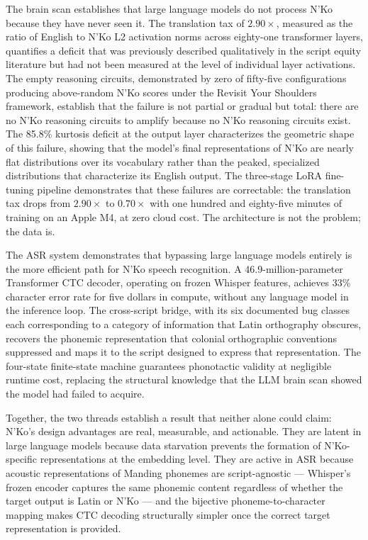 \documentclass[11pt]{article}
\newcommand{\nko}{N'Ko}
\begin{document}
The brain scan establishes that large language models do not process \nko{} because they have never seen it. The translation tax of $2.90\times$, measured as the ratio of English to \nko{} L2 activation norms across eighty-one transformer layers, quantifies a deficit that was previously described qualitatively in the script equity literature but had not been measured at the level of individual layer activations. The empty reasoning circuits, demonstrated by zero of fifty-five configurations producing above-random \nko{} scores under the Revisit Your Shoulders framework, establish that the failure is not partial or gradual but total: there are no \nko{} reasoning circuits to amplify because no \nko{} reasoning circuits exist. The 85.8\% kurtosis deficit at the output layer characterizes the geometric shape of this failure, showing that the model's final representations of \nko{} are nearly flat distributions over its vocabulary rather than the peaked, specialized distributions that characterize its English output. The three-stage LoRA fine-tuning pipeline demonstrates that these failures are correctable: the translation tax drops from $2.90\times$ to $0.70\times$ with one hundred and eighty-five minutes of training on an Apple M4, at zero cloud cost. The architecture is not the problem; the data is.

The ASR system demonstrates that bypassing large language models entirely is the more efficient path for \nko{} speech recognition. A 46.9-million-parameter Transformer CTC decoder, operating on frozen Whisper features, achieves 33\% character error rate for five dollars in compute, without any language model in the inference loop. The cross-script bridge, with its six documented bug classes each corresponding to a category of information that Latin orthography obscures, recovers the phonemic representation that colonial orthographic conventions suppressed and maps it to the script designed to express that representation. The four-state finite-state machine guarantees phonotactic validity at negligible runtime cost, replacing the structural knowledge that the LLM brain scan showed the model had failed to acquire.

Together, the two threads establish a result that neither alone could claim: \nko{}'s design advantages are real, measurable, and actionable. They are latent in large language models because data starvation prevents the formation of \nko{}-specific representations at the embedding level. They are active in ASR because acoustic representations of Manding phonemes are script-agnostic --- Whisper's frozen encoder captures the same phonemic content regardless of whether the target output is Latin or \nko{} --- and the bijective phoneme-to-character mapping makes CTC decoding structurally simpler once the correct target representation is provided.
\end{document}
